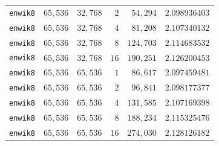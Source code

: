 \begin{longtable}{lrrrrr}
\texttt{enwik8} & $65{,}536$ & $32{,}768$ & $2$ & $54{,}294$ & $2.098936403$ \\
\texttt{enwik8} & $65{,}536$ & $32{,}768$ & $4$ & $81{,}208$ & $2.107340132$ \\
\texttt{enwik8} & $65{,}536$ & $32{,}768$ & $8$ & $124{,}703$ & $2.114683532$ \\
\texttt{enwik8} & $65{,}536$ & $32{,}768$ & $16$ & $190{,}251$ & $2.126200453$ \\
\texttt{enwik8} & $65{,}536$ & $65{,}536$ & $1$ & $86{,}617$ & $2.097459481$ \\
\texttt{enwik8} & $65{,}536$ & $65{,}536$ & $2$ & $96{,}841$ & $2.098177377$ \\
\texttt{enwik8} & $65{,}536$ & $65{,}536$ & $4$ & $131{,}585$ & $2.107169398$ \\
\texttt{enwik8} & $65{,}536$ & $65{,}536$ & $8$ & $188{,}234$ & $2.115325476$ \\
\texttt{enwik8} & $65{,}536$ & $65{,}536$ & $16$ & $274{,}030$ & $2.128126182$ \\
\end{longtable}

